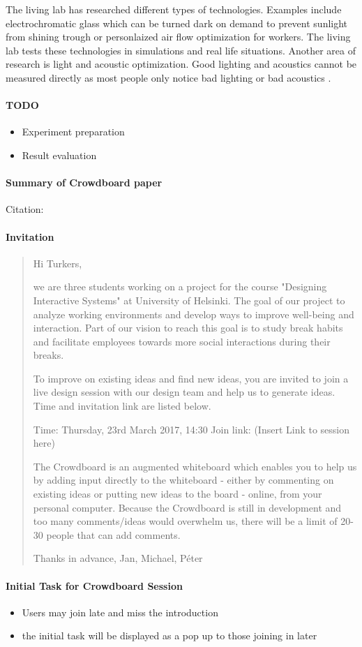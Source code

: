 \documentclass[english]{tktltiki}
\begin{document}
The living lab has researched different types of technologies. Examples include electrochromatic 
glass which can be turned dark on demand to prevent sunlight from shining trough or personlaized air 
flow optimization for workers. The living lab tests these technologies in simulations and real life 
situations. Another area of research is light and acoustic optimization. Good lighting and acoustics 
cannot be measured directly as most people only notice bad lighting or bad acoustics \cite{living-lab}.


\paragraph{TODO}
\begin{itemize}
  \item Experiment preparation
  \item Result evaluation
\end{itemize}

\paragraph{Summary of Crowdboard paper} Citation: \cite{crowdboard}


\paragraph{Invitation}
\begin{quote}
Hi Turkers,

we are three students working on a project for the course "Designing Interactive Systems" at University of Helsinki. The goal of our project to analyze working environments and develop ways to improve well-being and interaction. Part of our vision to reach this goal is to study break habits and facilitate employees towards more social interactions during their breaks. 

To improve on existing ideas and find new ideas, you are invited to join a live design session with our design team and help us to generate ideas. Time and invitation link are listed below.

Time: Thursday, 23rd March 2017, 14:30
Join link: (Insert Link to session here)

The Crowdboard is an augmented whiteboard which enables you to help us by adding input directly to the whiteboard - either by commenting on existing ideas or putting new ideas to the board - online, from your personal computer. Because the Crowdboard is still in development and too many comments/ideas would overwhelm us, there will be a limit of 20-30 people that can add comments. 

Thanks in advance,
Jan, Michael, Péter
\end{quote}


\paragraph{Initial Task for Crowdboard Session}
\begin{itemize}
  \item Users may join late and miss the introduction 
  \item the initial task will be displayed as a pop up to those joining in later
\end{itemize}
\end{document}
